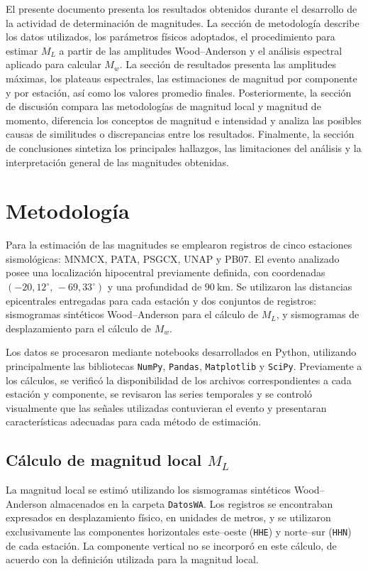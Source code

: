 \documentclass[a4paper,12pt]{article} %
\numberwithin{equation}{section} %
\numberwithin{figure}{section} %
\begin{document}
El presente documento presenta los resultados obtenidos durante el desarrollo de la actividad de determinación de magnitudes. La sección de metodología describe los datos utilizados, los parámetros físicos adoptados, el procedimiento para estimar \(M_L\) a partir de las amplitudes Wood--Anderson y el análisis espectral aplicado para calcular \(M_w\). La sección de resultados presenta las amplitudes máximas, los plateaus espectrales, las estimaciones de magnitud por componente y por estación, así como los valores promedio finales. Posteriormente, la sección de discusión compara las metodologías de magnitud local y magnitud de momento, diferencia los conceptos de magnitud e intensidad y analiza las posibles causas de similitudes o discrepancias entre los resultados. Finalmente, la sección de conclusiones sintetiza los principales hallazgos, las limitaciones del análisis y la interpretación general de las magnitudes obtenidas.
\newpage

\section{Metodología}

Para la estimación de las magnitudes se emplearon registros de cinco estaciones sismológicas: MNMCX, PATA, PSGCX, UNAP y PB07. El evento analizado posee una localización hipocentral previamente definida, con coordenadas \((-20{,}12^\circ,\,-69{,}33^\circ)\) y una profundidad de \(90~\mathrm{km}\). Se utilizaron las distancias epicentrales entregadas para cada estación y dos conjuntos de registros: sismogramas sintéticos Wood--Anderson para el cálculo de \(M_L\), y sismogramas de desplazamiento para el cálculo de \(M_w\).

Los datos se procesaron mediante notebooks desarrollados en Python, utilizando principalmente las bibliotecas \texttt{NumPy}, \texttt{Pandas}, \texttt{Matplotlib} y \texttt{SciPy}. Previamente a los cálculos, se verificó la disponibilidad de los archivos correspondientes a cada estación y componente, se revisaron las series temporales y se controló visualmente que las señales utilizadas contuvieran el evento y presentaran características adecuadas para cada método de estimación.

\subsection{Cálculo de magnitud local \(M_L\)}

La magnitud local se estimó utilizando los sismogramas sintéticos Wood--Anderson almacenados en la carpeta \texttt{DatosWA}. Los registros se encontraban expresados en desplazamiento físico, en unidades de metros, y se utilizaron exclusivamente las componentes horizontales este--oeste (\texttt{HHE}) y norte--sur (\texttt{HHN}) de cada estación. La componente vertical no se incorporó en este cálculo, de acuerdo con la definición utilizada para la magnitud local.
\end{document}
